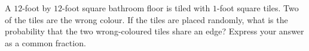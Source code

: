 A $12$-foot by $12$-foot square bathroom floor is tiled with $1$-foot square tiles. Two of the tiles are the wrong colour. If the tiles are placed randomly, what is the probability that the two wrong-coloured tiles share an edge? Express your answer as a common fraction.
